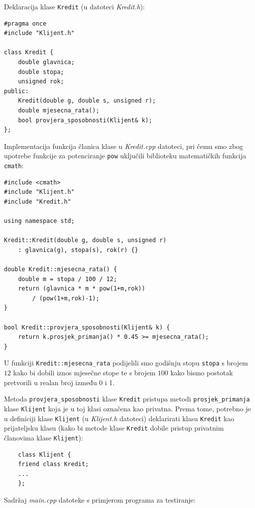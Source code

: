 \begin{rjesenje}
    Deklaracija klase \texttt{Kredit} (u datoteci \textit{Kredit.h}):
    \begin{verbatim}
#pragma once
#include "Klijent.h"

class Kredit {
	double glavnica;
	double stopa;
	unsigned rok;
public:
    Kredit(double g, double s, unsigned r);
    double mjesecna_rata();
    bool provjera_sposobnosti(Klijent& k);	
};
    \end{verbatim}

Implementacija funkcija članica klase u \textit{Kredit.cpp} datoteci,
pri čemu smo zbog upotrebe funkcije za potenciranje \texttt{pow}
uključili biblioteku matematičkih funkcija \texttt{cmath}:
    \begin{verbatim}
#include <cmath>
#include "Klijent.h"
#include "Kredit.h"

using namespace std;

Kredit::Kredit(double g, double s, unsigned r)
    : glavnica(g), stopa(s), rok(r) {}

double Kredit::mjesecna_rata() {
    double m = stopa / 100 / 12;
    return (glavnica * m * pow(1+m,rok))
		/ (pow(1+m,rok)-1);
}

bool Kredit::provjera_sposobnosti(Klijent& k) {
    return k.prosjek_primanja() * 0.45 >= mjesecna_rata();
}
    \end{verbatim}
    U funkciji \texttt{Kredit::mjesecna\_rata} podijelili
    smo godišnju stopu \texttt{stopa} s brojem $12$
    kako bi dobili iznos mjesečne stope
    te s brojem $100$ kako bismo postotak pretvorili u 
    realan broj između 0 i 1.
    \medskip
    
    Metoda \texttt{provjera\_sposobnosti} klase \texttt{Kredit} pristupa metodi \texttt{prosjek\_primanja} klase \texttt{Klijent}
    koja je u toj klasi označena kao privatna.
    Prema tome, potrebno je u definiciji klase \texttt{Klijent}
    (u \textit{Klijent.h} datoteci)
    deklarirati klasu \texttt{Kredit} kao prijateljsku klasu
    (kako bi metode klase \texttt{Kredit} dobile pristup privatnim članovima klase \texttt{Klijent}):
    \begin{verbatim}
    class Klijent {
    friend class Kredit;    
    ...
    };
    \end{verbatim}

    Sadržaj \textit{main.cpp} datoteke s primjerom programa za testiranje:


\end{rjesenje}

